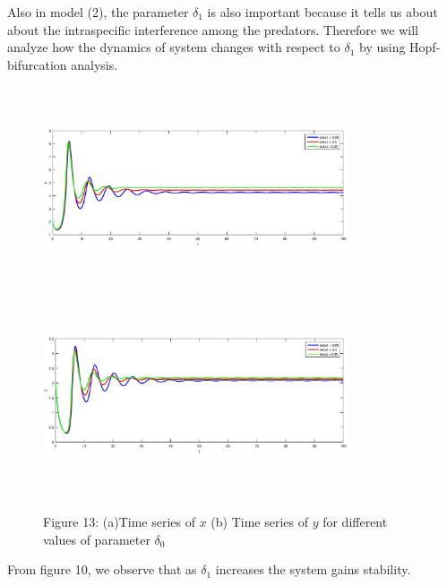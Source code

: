 \documentclass[a4paper, 10pt]{article}
\begin{document}
Also in model (2), the parameter $\delta_1$ is also important because it tells us about about the intraspecific interference among the predators. Therefore we will analyze how the dynamics of system changes with respect to $\delta_1$ by using Hopf-bifurcation analysis.
\begin{figure}[H]
	{\includegraphics[width=9cm, height=6cm]{20a.eps}}
	\endminipage\hfill
	{\includegraphics[width=9cm, height=6cm]{20b.eps}}
	\endminipage\hfill
	\begin{center} Figure 13: (a)Time series of $x$  (b) Time series of $y$  for different values of parameter $\delta_0$   \end{center}
\end{figure}
From figure 10, we observe that as $\delta_1$ increases the system gains stability.
\end{document}
